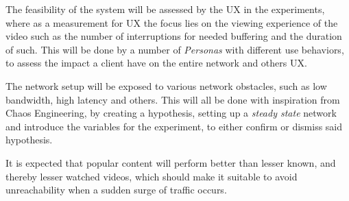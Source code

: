 The feasibility of the system will be assessed by the \ac{UX} in the experiments, where as a measurement for \ac{UX} the focus lies on the viewing experience of the video such as the number of interruptions for needed buffering and the duration of such. This will be done by a number of \emph{Personas} with different use behaviors, to assess the impact a client have on the entire network and others \ac{UX}.


The network setup will be exposed to various network obstacles, such as low bandwidth, high latency and others. This will all be done with inspiration from Chaos Engineering, by creating a hypothesis, setting up a \emph{steady state} network and introduce the variables for the experiment, to either confirm or dismiss said hypothesis.


It is expected that popular content will perform better than lesser known, and thereby lesser watched videos, which should make it suitable to avoid unreachability when a sudden surge of traffic occurs.


